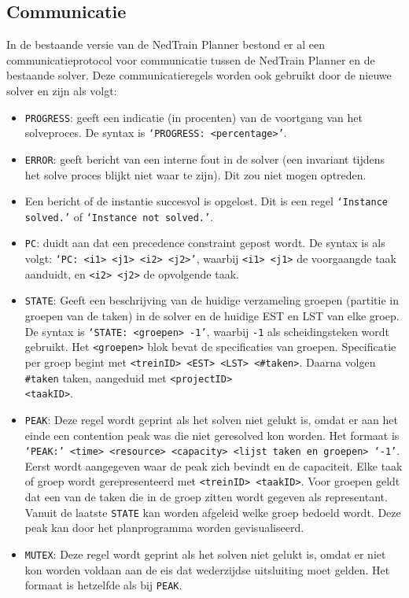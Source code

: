 \subsection{Communicatie}
In de bestaande versie van de NedTrain Planner bestond er al een communicatieprotocol voor communicatie tussen de NedTrain Planner en de bestaande solver. Deze communicatieregels worden ook gebruikt door de nieuwe solver \cite{bep2012nedtrain} en zijn als volgt:
\begin{itemize}
    \item \texttt{PROGRESS}: geeft een indicatie (in procenten) van de voortgang van het solveproces. De syntax is \texttt{\textquoteleft PROGRESS: <percentage>\textquoteright}.
    \item \texttt{ERROR}: geeft bericht van een interne fout in de solver (een invariant tijdens het solve proces blijkt niet waar te zijn). Dit zou niet mogen optreden.
    \item Een bericht of de instantie succesvol is opgelost. Dit is een regel \texttt{\textquoteleft Instance solved.\textquoteright} of \texttt{\textquoteleft Instance not solved.\textquoteright}.
    \item \texttt{PC}: duidt aan dat een precedence constraint gepost wordt. De syntax is als volgt: \texttt{\textquoteleft PC: <i1> <j1> <i2> <j2>\textquoteright}, waarbij \texttt{<i1> <j1>} de voorgaangde taak aanduidt, en \texttt{<i2> <j2>} de opvolgende taak.
    \item \texttt{STATE}: Geeft een beschrijving van de huidige verzameling groepen (partitie in groepen van de taken) in de solver en de huidige EST en LST van elke groep. De syntax is \texttt{\textquoteleft STATE: <groepen> -1\textquoteright}, waarbij \texttt{-1} als scheidingsteken wordt gebruikt. Het \texttt{<groepen>} blok bevat de specificaties van groepen. Specificatie per groep begint met \texttt{<treinID> <EST> <LST> <\#taken>}. Daarna volgen \texttt{\#taken} taken, aangeduid met \texttt{<projectID>} \\ \texttt{<taakID>}.
    \item \texttt{PEAK}: Deze regel wordt geprint als het solven niet gelukt is, omdat er aan het einde een contention peak was die niet geresolved kon worden. Het formaat is \texttt{\textquoteleft PEAK:\textquoteright \ <time> <resource> <capacity> <lijst taken en groepen> \textquoteleft -1\textquoteright}. Eerst wordt aangegeven waar de peak zich bevindt en de capaciteit. Elke taak of groep wordt gerepresenteerd met \texttt{<treinID> <taakID>}. Voor groepen geldt dat een van de taken die in de groep zitten wordt gegeven als representant. Vanuit de laatste \texttt{STATE} kan worden afgeleid welke groep bedoeld wordt. Deze peak kan door het planprogramma worden gevisualiseerd.
    \item \texttt{MUTEX}: Deze regel wordt geprint als het solven niet gelukt is, omdat er niet kon worden voldaan aan de eis dat wederzijdse uitsluiting moet gelden. Het formaat is hetzelfde als bij \texttt{PEAK}.
\end{itemize}
